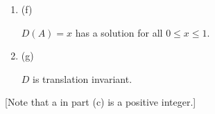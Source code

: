 \begin{enumerate}
\begin{enumerate}[label=(\alph*)]
  \item (f)
    \begin{claim*}
	    $D(A) = x$ has a solution for all $0 \leq x \leq 1$.
    \end{claim*}

  \item (g)
    \begin{claim*}
      $D$ is translation invariant.
    \end{claim*}
  \end{enumerate}
  [Note that a in part (c) is a positive integer.]

\end{enumerate}
